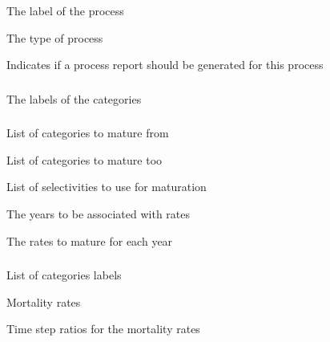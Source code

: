 
 {The label of the process}

 {The type of process}

 {Indicates if a process report should be generated for this process}

\subsubsection[Ageing]{}

 {The labels of the categories}

\subsubsection[Maturation]{}

 {List of categories to mature from}

 {List of categories to mature too}

 {List of selectivities to use for maturation}

 {The years to be associated with rates}

 {The rates to mature for each year}

\subsubsection[Mortality Constant Rate]{}

 {List of categories labels}

 {Mortality rates}

 {Time step ratios for the mortality rates}

